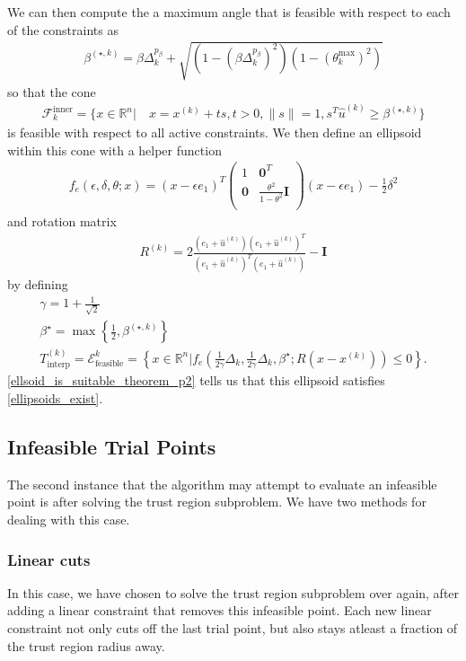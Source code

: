 \documentclass{article}
\theoremstyle{case}
\newcommand{\xk}{{x^{(k)}}}
\newcommand{\Rn}{\mathbb R^n}
\newcommand{\dk}{\Delta_k}
\newcommand{\sampletrk}{{T_{\text{interp}}^{(k)}}}
\newcommand{\unshiftedellipsoid}{{\mathcal E^k_{\text{feasible}}}}
\newcommand{\rotk}{{R^{(k)}}}
\newcommand{\huk}{{{\hat u}^{(k)}}}
\newcommand{\bsk}{{\beta^{(\star, k)}}}
\newcommand{\fcki}{{\mathcal {F}^{\text{inner}}_k}}
\begin{document}
We can then compute the a maximum angle that is feasible with respect to each of the constraints as
\begin{align}
\bsk = \beta\dk^{p_{\beta}} + \sqrt{\left(1 - \left(\beta\dk^{p_{\beta}}\right)^2\right)\left(1 - (\theta^{\text{max}}_k) ^2\right)} \label{define_bsk}
\end{align}
so that the cone
\begin{align}
\fcki = \{x \in \Rn | \quad x = \xk + ts, t > 0, \|s\| = 1, s^T\huk \ge \bsk \} \label{define_inner_cone}
\end{align}
is feasible with respect to all active constraints.
We then define an ellipsoid within this cone with a helper function
\begin{align}
f_e(\epsilon, \delta, \theta; x) = (x - \epsilon e_1)^T\begin{pmatrix}
1 & \boldsymbol0^T \\
\boldsymbol 0 & \frac{\theta^2}{1 - \theta^2} \boldsymbol I \\
\end{pmatrix}(x - \epsilon e_1) - \frac 1 2 \delta^2 \label{define_ellipse_function}
\end{align}
and rotation matrix
\begin{align}
\rotk = 2\frac{(e_1 + \huk)(e_1 + \huk)^T}{(e_1 + \huk)^T(e_1 + \huk)} - \boldsymbol I \label{define_rotation}
\end{align}
by defining
\begin{align}
\gamma = 1 + \frac 1 {\sqrt{2}} \\
\beta^{\star} = \max\left\{\frac 1 2 , \bsk\right\} \\
\sampletrk = \unshiftedellipsoid = \left\{x \in \Rn | f_e\left(\frac 1 {2\gamma} \dk, \frac 1 {2\gamma} \dk, \beta^{\star}; R(x - \xk)\right) \le 0\right\}. \label{define_ellipsek}
\end{align}
\cref{ellsoid_is_suitable_theorem_p2} tells us that this ellipsoid satisfies \cref{ellipsoids_exist}.

\subsection{Infeasible Trial Points}
\label{convex_model_reduction}

The second instance that the algorithm may attempt to evaluate an infeasible point is after solving the trust region subproblem.
We have two methods for dealing with this case.

\subsubsection{Linear cuts}
In this case, we have chosen to solve the trust region subproblem over again, after adding a linear constraint that removes this infeasible point.
Each new linear constraint not only cuts off the last trial point, but also stays atleast a fraction of the trust region radius away.
\end{document}
